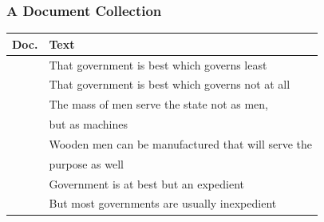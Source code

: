 \documentclass[svgnames]{beamer}
\begin{document}

\setcounter{num}{0}
\newcommand{\inum}{\addtocounter{num}{1}\thenum}

\begin{frame}
    \frametitle{A Document Collection}
    
    \begin{block}{}
        \small
        \begin{tabular}{rl}
            Doc. & Text \\\hline
            \inum & That government is best which governs least \\
            \inum & That government is best which governs not at all \\
            \inum & The mass of men serve the state not as men, \\
            & but as machines \\
            \inum & Wooden men can be manufactured that will serve the \\
            & purpose as well \\
            \inum & Government is at best but an expedient \\
            \inum & But most governments are usually inexpedient \\
        \end{tabular}
    \end{block}

\end{frame}

\end{document}
